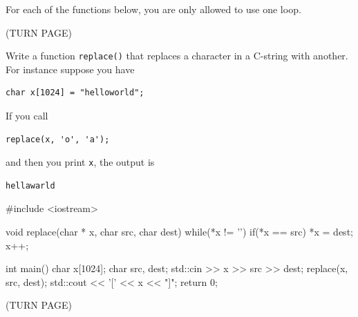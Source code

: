 

For each of the functions below, you are only allowed to use one loop.

(TURN PAGE)

\newpage
\nextq
Write a function \verb!replace()! that replaces a character in a C-string
with another.
For instance suppose you have
\vspace{-2mm}
\begin{Verbatim}[frame=single,fontsize=\small]
char x[1024] = "helloworld";
\end{Verbatim}
\vspace{-5mm}
If you call
\vspace{-3mm}
\begin{Verbatim}[frame=single,fontsize=\small]
replace(x, 'o', 'a');
\end{Verbatim}
\vspace{-4mm}
and then you print \verb!x!, the output is
\vspace{-3mm}
\begin{Verbatim}[frame=single,fontsize=\small]
hellawarld
\end{Verbatim}
\ANSWER
\begin{answercode}
#include <iostream>

void replace(char * x, char src, char dest)
{
  while(*x != '\0')
  {
    if(*x == src)
        *x = dest;
    x++;
  }
}

int main()
{
    char x[1024];
    char src, dest;
    std::cin >> x >> src >> dest;
    replace(x, src, dest);
    std::cout << '[' << x << "]\n";
    return 0;
}
\end{answercode}

(TURN PAGE)

